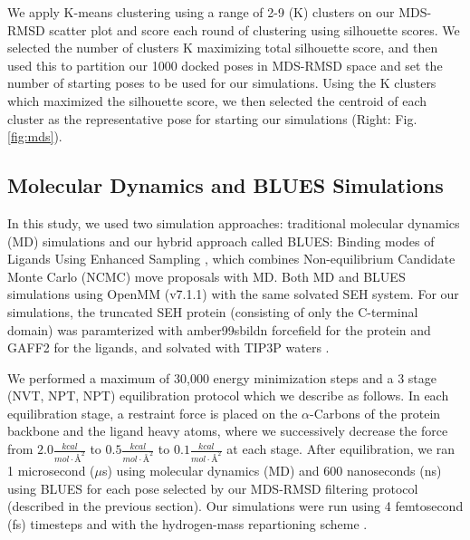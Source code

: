 We apply K-means clustering using a range of 2-9 (K) clusters on our MDS-RMSD scatter plot and score each round of clustering using silhouette scores.
We selected the number of clusters K maximizing total silhouette score, and then used this to partition our 1000 docked poses in MDS-RMSD space and set the number of starting poses to be used for our simulations.
Using the K clusters which maximized the silhouette score, we then selected the centroid of each cluster as the representative pose for starting our simulations (Right: Fig. \ref{fig:mds}).

\subsection{Molecular Dynamics and BLUES Simulations}
In this study, we used two simulation approaches: traditional molecular dynamics (MD) simulations and our hybrid approach called BLUES: Binding modes of Ligands Using Enhanced Sampling \cite{BLUES_paper}, which combines Non-equilibrium Candidate Monte Carlo (NCMC) \cite{ncmc_paper} move proposals with MD.
Both MD and BLUES simulations using OpenMM (v7.1.1) \cite{openmm} with the same solvated SEH system.
For our simulations, the truncated SEH protein (consisting of only the C-terminal domain) was paramterized with amber99sbildn forcefield for the protein and GAFF2 for the ligands, and solvated with TIP3P waters \cite{lindorff-larsen_improved_2010}.

We performed a maximum of 30,000 energy minimization steps and a 3 stage (NVT, NPT, NPT) equilibration protocol which we describe as follows.
In each equilibration stage, a restraint force is placed on the $\alpha$-Carbons of the protein backbone and the ligand heavy atoms, where we successively decrease the force from $2.0 \frac{kcal}{mol \cdot \mbox{\AA} ^{2}}$ to $0.5 \frac{kcal}{mol \cdot \mbox{\AA} ^{2}}$ to $0.1 \frac{kcal}{mol \cdot \mbox{\AA} ^{2}}$ at each stage.
After equilibration, we ran 1 microsecond ($\mu$s) using molecular dynamics (MD) and 600 nanoseconds (ns) using BLUES for each pose selected by our MDS-RMSD filtering protocol (described in the previous section).
Our simulations were run using 4 femtosecond (fs) timesteps and with the hydrogen-mass repartioning scheme \cite{hmass_repartition}.

